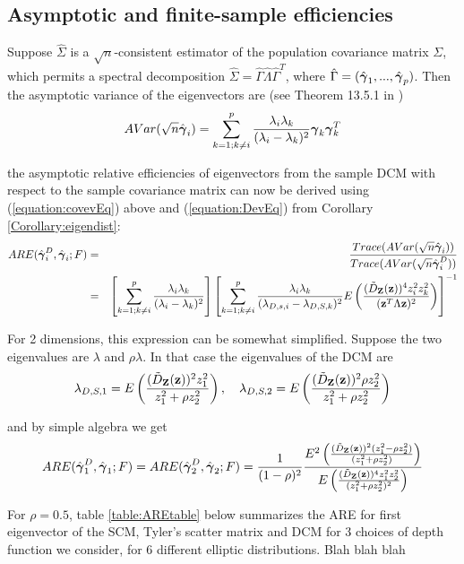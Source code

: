\documentclass[fleqn,12pt]{article}
\begin{document}
\subsection{Asymptotic and finite-sample efficiencies}
Suppose $\hat\Sigma$ is a $\sqrt n$-consistent estimator of the population covariance matrix $\Sigma$, which permits a spectral decomposition $ \hat\Sigma = \hat\Gamma \hat\Lambda \hat\Gamma^T $, where $\hat\Gamma = (\hat{{\boldsymbol{\gamma}}}_1,...,\hat{{\boldsymbol{\gamma}}}_p)$. Then the asymptotic variance of the eigenvectors are (see Theorem 13.5.1 in \cite{anderson})
\begin{equation} \label{equation:covevEq}
AVar(\sqrt n\hat {{\boldsymbol{\gamma}}}_i) = \sum_{k=1; k \neq i}^p \frac{\lambda_i \lambda_k}{(\lambda_i - \lambda_k)^2} {\boldsymbol{\gamma}}_k {\boldsymbol{\gamma}}_k^T
\end{equation}

the asymptotic relative efficiencies of eigenvectors from the sample DCM with respect to the sample covariance matrix can now be derived using (\ref{equation:covevEq}) above and (\ref{equation:DevEq}) from Corollary \ref{Corollary:eigendist}:
\begin{eqnarray*}
ARE(\hat{{\boldsymbol{\gamma}}}^D_i, \hat{{\boldsymbol{\gamma}}}_i; F) &=& \frac{Trace( AVar(\sqrt n\hat {{\boldsymbol{\gamma}}}_i))}{Trace( AVar(\sqrt n\hat {{\boldsymbol{\gamma}}}^D_i))}\\
&=& \left[\sum_{k=1; k \neq i}^p \frac{\lambda_i \lambda_k}{(\lambda_i - \lambda_k)^2} \right] \left[ \sum_{k=1; k \neq i}^p \frac{\lambda_i \lambda_k }{(\lambda_{D,s,i} - \lambda_{D,S,k})^2} E \left( \frac{(\tilde D_{\mathbf{Z}} ({\bf{z}}))^4 z_i^2 z_k^2}{({\bf{z}}^T \Lambda {\bf{z}})^2} \right) \right]^{-1}
\end{eqnarray*}

For 2 dimensions, this expression can be somewhat simplified. Suppose the two eigenvalues are $\lambda$ and $\rho\lambda$. In that case the eigenvalues of the DCM are
$$ \lambda_{D,S,1} = E \left( \frac{(\tilde D_{\mathbf{Z}}({\bf{z}}))^2 z_1^2}{z_1^2 + \rho z_2^2} \right), \quad
\lambda_{D,S,2} = E \left( \frac{(\tilde D_{\mathbf{Z}}({\bf{z}}))^2 \rho z_2^2}{z_1^2 + \rho z_2^2} \right) $$

and by simple algebra we get
$$ ARE(\hat{{\boldsymbol{\gamma}}}^D_1, \hat{{\boldsymbol{\gamma}}}_1; F) = ARE(\hat{{\boldsymbol{\gamma}}}^D_2, \hat{{\boldsymbol{\gamma}}}_2; F) = \frac{1}{(1-\rho)^2} \frac{E^2 \left( \frac{(\tilde D_{\mathbf{Z}}({\bf{z}}))^2 (z_1^2 - \rho z_2^2)}{(z_1^2 + \rho z_2^2)} \right)}{E \left( \frac{(\tilde D_{\mathbf{Z}}({\bf{z}}))^4 z_1^2z_2^2}{(z_1^2 + \rho z_2^2)^2}\right)} $$

For $\rho=0.5$, table \ref{table:AREtable} below summarizes the ARE for first eigenvector of the SCM, Tyler's scatter matrix and DCM for 3 choices of depth function we consider, for 6 different elliptic distributions. Blah blah blah
\end{document}
